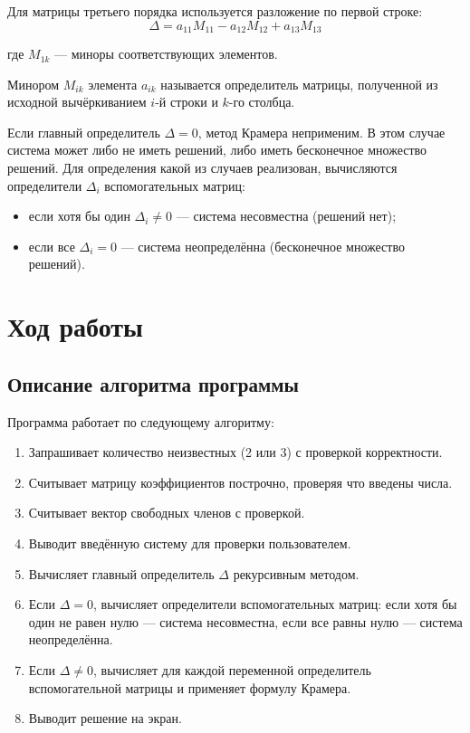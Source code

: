 \documentclass[14pt,a4paper]{scrartcl}
\begin{document}
Для матрицы третьего порядка используется разложение по первой строке:
\begin{equation}
\Delta = a_{11}M_{11} - a_{12}M_{12} + a_{13}M_{13}
\end{equation}

где $M_{1k}$ --- миноры соответствующих элементов.

Минором $M_{ik}$ элемента $a_{ik}$ называется определитель матрицы, 
полученной из исходной вычёркиванием $i$-й строки и $k$-го столбца.

Если главный определитель $\Delta = 0$, метод Крамера неприменим. 
В этом случае система может либо не иметь решений, либо иметь 
бесконечное множество решений. Для определения какой из случаев реализован, 
вычисляются определители $\Delta_i$ вспомогательных матриц:

\begin{itemize}
\item если хотя бы один $\Delta_i \neq 0$ --- система несовместна 
(решений нет);
\item если все $\Delta_i = 0$ --- система неопределённа 
(бесконечное множество решений).
\end{itemize}

\section{Ход работы}
\label{sec:exp}

\subsection{Описание алгоритма программы}

Программа работает по следующему алгоритму:

\begin{enumerate}
\item Запрашивает количество неизвестных (2 или 3) с проверкой корректности.
\item Считывает матрицу коэффициентов построчно, проверяя что введены числа.
\item Считывает вектор свободных членов с проверкой.
\item Выводит введённую систему для проверки пользователем.
\item Вычисляет главный определитель $\Delta$ рекурсивным методом.
\item Если $\Delta = 0$, вычисляет определители вспомогательных матриц: 
если хотя бы один не равен нулю --- система несовместна, 
если все равны нулю --- система неопределённа.
\item Если $\Delta \neq 0$, вычисляет для каждой переменной определитель вспомогательной матрицы и применяет формулу Крамера.
\item Выводит решение на экран.
\end{enumerate}
\end{document}
